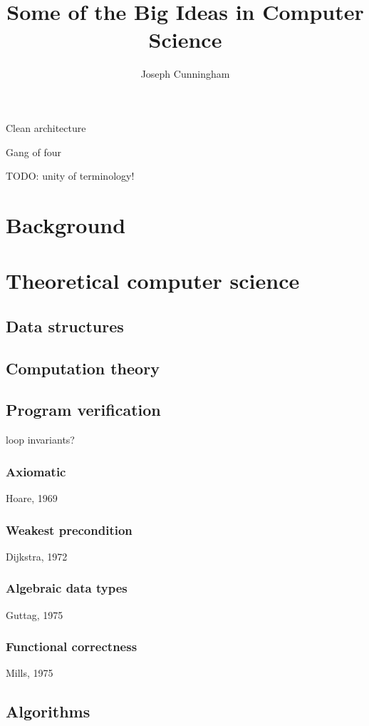 \documentclass{report}
\title{Some of the Big Ideas in Computer Science}
\author{Joseph Cunningham}
\date{}
\begin{document}
\maketitle
\tableofcontents

Clean architecture

Gang of four

TODO: unity of terminology!

\part{Background}
\setcounter{chapter}{0} %


\part{Theoretical computer science}
\setcounter{chapter}{0} %
\chapter{Data structures}


\chapter{Computation theory}


\chapter{Program verification}
loop invariants?
\section{Axiomatic}
Hoare, 1969
\section{Weakest precondition}
Dijkstra, 1972
\section{Algebraic data types}
Guttag, 1975
\section{Functional correctness}
Mills, 1975

\chapter{Algorithms}

\end{document}
